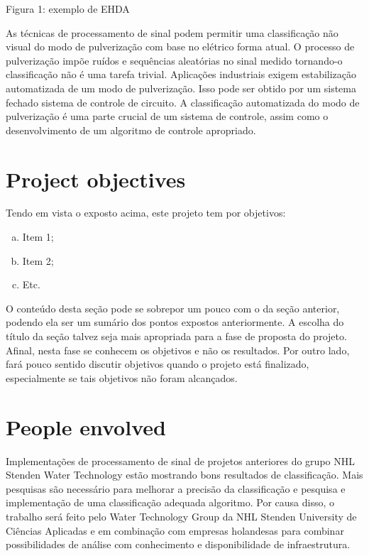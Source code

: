 Figura 1: exemplo de EHDA

As técnicas de processamento de sinal podem permitir uma classificação não visual do modo de pulverização com base no elétrico
forma atual. O processo de pulverização impõe ruídos e sequências aleatórias no sinal medido tornando-o
classificação não é uma tarefa trivial.
Aplicações industriais exigem estabilização automatizada de um modo de pulverização. Isso pode ser obtido por um sistema fechado
sistema de controle de circuito. A classificação automatizada do modo de pulverização é uma parte crucial de um sistema de controle, assim como
o desenvolvimento de um algoritmo de controle apropriado.

\section{Project objectives}
\label{sec:objetivos}

Tendo em vista o exposto acima, este projeto tem por objetivos:

\begin{enumerate}[a)]
\item Item 1;
\item Item 2; 
\item Etc.     
\end{enumerate}

O conteúdo desta seção pode se sobrepor um pouco com o da seção anterior, podendo ela ser um sumário dos pontos expostos anteriormente. A escolha do título da seção talvez seja mais apropriada para a fase de proposta do projeto. Afinal, nesta fase se conhecem os objetivos e não os resultados. Por outro lado, fará pouco sentido discutir objetivos quando o projeto está finalizado, especialmente se tais objetivos não foram alcançados. 


\section{People envolved}
\label{sec:empresa}

Implementações de processamento de sinal de projetos anteriores
do grupo NHL Stenden Water Technology estão mostrando bons resultados de classificação. Mais pesquisas são
necessário para melhorar a precisão da classificação e pesquisa e implementação de uma classificação adequada
algoritmo. Por causa disso, o trabalho será feito pelo Water Technology Group da NHL Stenden University
de Ciências Aplicadas e em combinação com empresas holandesas para combinar possibilidades de análise com conhecimento
e disponibilidade de infraestrutura.


\clearpage